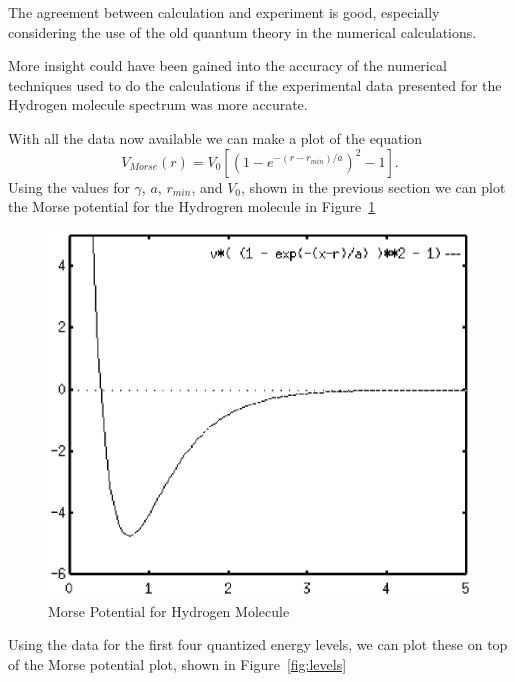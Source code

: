 \documentclass[a4paper]{IEEEtran}
\begin{document}
      The agreement between calculation and experiment is good,
      especially considering the use of the old quantum theory in the
      numerical calculations.

      More insight could have been gained into the accuracy of the
      numerical techniques used to do the calculations if the
      experimental data presented for the Hydrogen molecule spectrum was
      more accurate.

      With all the data now available we can make a plot of the equation
      \[ V_{Morse}(r) = V_0\left[\left(1-e^{-(r-r_{min})/a}\right)^2 - 1\right]. \]
      Using the values for $\gamma$, $a$, $r_{min}$, and $V_0$, shown in
      the previous section we can plot the Morse potential for the
      Hydrogren molecule in Figure~\ref{fig:morse} 

        \begin{figure}
        \centering
        \includegraphics[width=0.8\columnwidth]{morse.eps}
        \caption{Morse Potential for Hydrogen Molecule} 
        \label{fig:morse} 
        \end{figure} 


      Using the data for the first four quantized energy levels, we can
      plot these on top of the Morse potential plot, shown in 
      Figure~\ref{fig:levels} 
\end{document}
